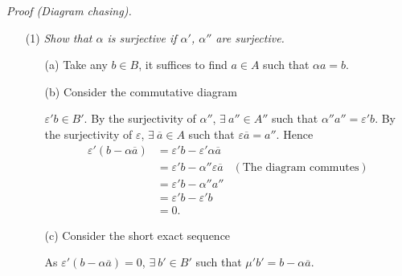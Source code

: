 \documentclass{article}
\begin{document}
\emph{Proof (Diagram chasing).}
\begin{enumerate}
\item[(1)]
  \emph{Show that $\alpha$ is surjective if $\alpha'$, $\alpha''$ are surjective.}
  \begin{enumerate}
  \item[(a)]
    Take any $b \in B$, it suffices to find $a \in A$ such that $\alpha a = b$.

  \item[(b)]
    Consider the commutative diagram
    \begin{center}
    \end{center}
    $\varepsilon' b \in B'$.
    By the surjectivity of $\alpha''$, $\exists \: a'' \in A''$ such that $\alpha'' a'' = \varepsilon' b$.
    By the surjectivity of $\varepsilon$, $\exists \: \overline{a} \in A$
    such that $\varepsilon \overline{a} = a''$.
    Hence
    \begin{align*}
      \varepsilon'(b - \alpha \overline{a})
      &= \varepsilon' b - \varepsilon' \alpha \overline{a} \\
      &= \varepsilon' b - \alpha'' \varepsilon \overline{a}
        &(\text{The diagram commutes}) \\
      &= \varepsilon' b - \alpha'' a'' \\
      &= \varepsilon' b - \varepsilon' b \\
      &= 0.
    \end{align*}

  \item[(c)]
    Consider the short exact sequence
    \begin{center}
    \end{center}
    As $\varepsilon'(b - \alpha \overline{a}) = 0$,
    $\exists \: b' \in B'$ such that $\mu' b' = b - \alpha \overline{a}$.


\end{enumerate}
\end{enumerate}
\end{document}
